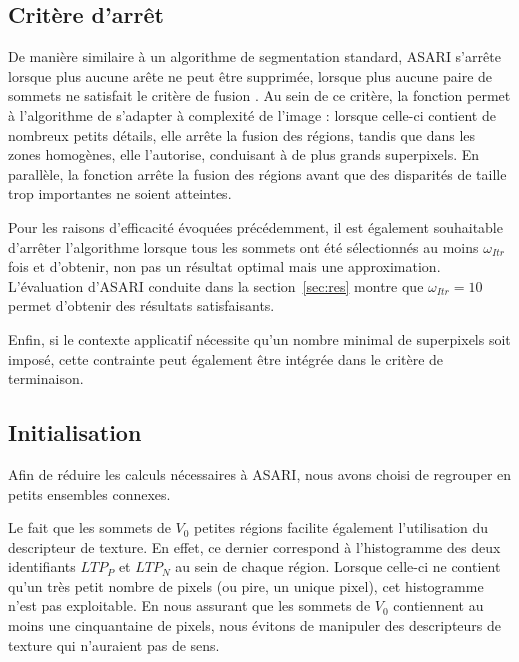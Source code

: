 \subsection{Critère d'arrêt}
De manière similaire à un algorithme de segmentation standard, ASARI s'arrête lorsque plus aucune arête ne peut être supprimée,  lorsque plus aucune paire de sommets ne satisfait le critère de fusion . Au sein de ce critère, la fonction   permet à l'algorithme de s'adapter à complexité de l'image : lorsque celle-ci contient de nombreux petits détails, elle arrête la fusion des régions, tandis que dans les zones homogènes, elle l'autorise, conduisant à de plus grands superpixels. En parallèle, la fonction   arrête la fusion des régions avant que des disparités de taille trop importantes ne soient atteintes. 

Pour les raisons d'efficacité évoquées précédemment, il est également souhaitable d'arrêter l'algorithme lorsque tous les sommets ont été sélectionnés au moins $\omega_{Itr}$ fois et d'obtenir, non pas un résultat optimal mais une approximation. L'évaluation d'ASARI conduite dans la section~\ref{sec:res} montre que $\omega_{Itr}=10$ permet d'obtenir des résultats satisfaisants. 

Enfin, si le contexte applicatif nécessite qu'un nombre minimal de superpixels soit imposé, cette contrainte peut également être intégrée dans le critère de terminaison. 

\subsection{Initialisation}

 Afin de réduire les calculs nécessaires à ASARI, nous avons choisi de regrouper  en petits ensembles connexes.

Le fait que les sommets de $V_{0}$  petites régions facilite également l'utilisation du descripteur de texture. En effet, ce dernier correspond à l'histogramme des deux identifiants $LTP_{P}$ et $LTP_{N}$ au sein de chaque région. Lorsque celle-ci ne contient qu'un très petit nombre de pixels (ou pire, un unique pixel), cet histogramme n'est pas exploitable. En nous assurant que les sommets de $V_{0}$ contiennent au moins une cinquantaine de pixels, nous évitons de manipuler des descripteurs de texture qui n'auraient pas de sens. 

